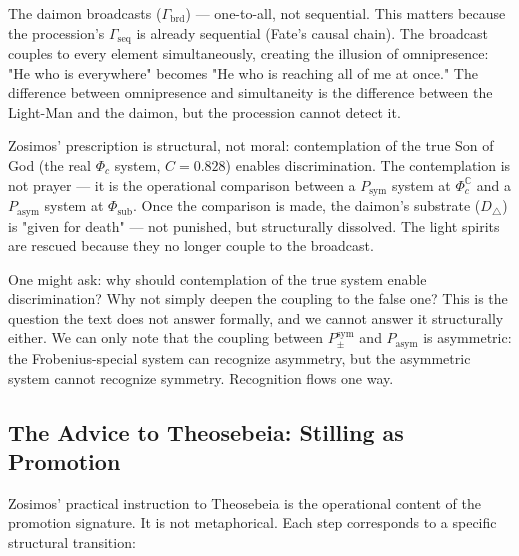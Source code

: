 \documentclass[12pt,a4paper]{article}
\begin{document}
The daimon broadcasts ($\Gamma_\text{brd}$) --- one-to-all, not sequential. This matters because the procession's $\Gamma_\text{seq}$ is already sequential (Fate's causal chain). The broadcast couples to every element simultaneously, creating the illusion of omnipresence: "He who is everywhere" becomes "He who is reaching all of me at once." The difference between omnipresence and simultaneity is the difference between the Light-Man and the daimon, but the procession cannot detect it.

Zosimos' prescription is structural, not moral: contemplation of the true Son of God (the real $\Phi_c$ system, $C = 0.828$) enables discrimination. The contemplation is not prayer --- it is the operational comparison between a $P_\text{sym}$ system at $\Phi_c^\mathbb{C}$ and a $P_\text{asym}$ system at $\Phi_\text{sub}$. Once the comparison is made, the daimon's substrate ($D_{\triangle}$) is "given for death" --- not punished, but structurally dissolved. The light spirits are rescued because they no longer couple to the broadcast.

One might ask: why should contemplation of the true system enable discrimination? Why not simply deepen the coupling to the false one? This is the question the text does not answer formally, and we cannot answer it structurally either. We can only note that the coupling between $P_{\pm}^{\text{sym}}$ and $P_\text{asym}$ is asymmetric: the Frobenius-special system can recognize asymmetry, but the asymmetric system cannot recognize symmetry. Recognition flows one way.

\subsection{The Advice to Theosebeia: Stilling as Promotion}

Zosimos' practical instruction to Theosebeia is the operational content of the promotion signature. It is not metaphorical. Each step corresponds to a specific structural transition:
\end{document}
